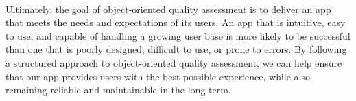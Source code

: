 \paragraph{}
Ultimately, the goal of object-oriented quality assessment is to deliver an app that meets the needs and expectations of its users. An app that is intuitive, easy to use, and capable of handling a growing user base is more likely to be successful than one that is poorly designed, difficult to use, or prone to errors. By following a structured approach to object-oriented quality assessment, we can help ensure that our app provides users with the best possible experience, while also remaining reliable and maintainable in the long term.

\clearpage